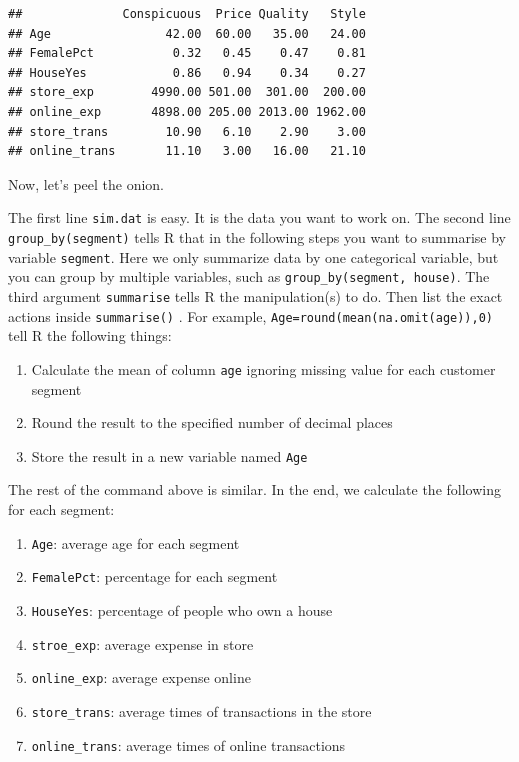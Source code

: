 \documentclass[12pt,]{krantz}
\providecommand{\tightlist}{%
  \setlength{\itemsep}{0pt}\setlength{\parskip}{0pt}}
\begin{document}
\begin{verbatim}
##              Conspicuous  Price Quality   Style
## Age                42.00  60.00   35.00   24.00
## FemalePct           0.32   0.45    0.47    0.81
## HouseYes            0.86   0.94    0.34    0.27
## store_exp        4990.00 501.00  301.00  200.00
## online_exp       4898.00 205.00 2013.00 1962.00
## store_trans        10.90   6.10    2.90    3.00
## online_trans       11.10   3.00   16.00   21.10
\end{verbatim}

Now, let's peel the onion.

The first line \texttt{sim.dat} is easy. It is the data you want to work on. The second line \texttt{group\_by(segment)} tells R that in the following steps you want to summarise by variable \texttt{segment}. Here we only summarize data by one categorical variable, but you can group by multiple variables, such as \texttt{group\_by(segment,\ house)}. The third argument \texttt{summarise} tells R the manipulation(s) to do. Then list the exact actions inside \texttt{summarise()} . For example, \texttt{Age=round(mean(na.omit(age)),0)} tell R the following things:

\begin{enumerate}
\def\labelenumi{\arabic{enumi}.}
\tightlist
\item
  Calculate the mean of column \texttt{age} ignoring missing value for each customer segment
\item
  Round the result to the specified number of decimal places
\item
  Store the result in a new variable named \texttt{Age}
\end{enumerate}

The rest of the command above is similar. In the end, we calculate the following for each segment:

\begin{enumerate}
\def\labelenumi{\arabic{enumi}.}
\tightlist
\item
  \texttt{Age}: average age for each segment
\item
  \texttt{FemalePct}: percentage for each segment
\item
  \texttt{HouseYes}: percentage of people who own a house
\item
  \texttt{stroe\_exp}: average expense in store
\item
  \texttt{online\_exp}: average expense online
\item
  \texttt{store\_trans}: average times of transactions in the store
\item
  \texttt{online\_trans}: average times of online transactions
\end{enumerate}
\end{document}
